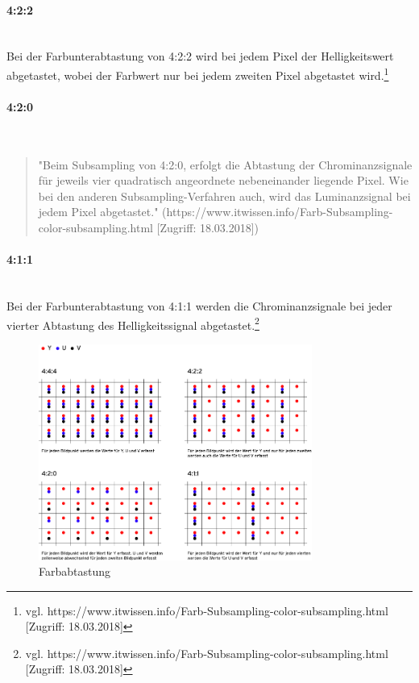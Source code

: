 \paragraph{4:2:2}
\leavevmode \\
Bei der Farbunterabtastung von 4:2:2 wird bei jedem Pixel der Helligkeitswert abgetastet, wobei der Farbwert nur bei jedem zweiten Pixel abgetastet wird.\footnote{\label{}vgl. https://www.itwissen.info/Farb-Subsampling-color-subsampling.html [Zugriff: 18.03.2018]}
\paragraph{4:2:0}
\leavevmode \\
\begin{quote}"Beim Subsampling von 4:2:0, erfolgt die Abtastung der Chrominanzsignale für jeweils vier quadratisch angeordnete nebeneinander liegende Pixel. Wie bei den anderen Subsampling-Verfahren auch, wird das Luminanzsignal bei jedem Pixel abgetastet." (https://www.itwissen.info/Farb-Subsampling-color-subsampling.html [Zugriff: 18.03.2018])\end{quote}
\paragraph{4:1:1}
\leavevmode \\
Bei der Farbunterabtastung von 4:1:1 werden die Chrominanzsignale bei jeder vierter Abtastung des Helligkeitssignal abgetastet.\footnote{\label{}vgl. https://www.itwissen.info/Farb-Subsampling-color-subsampling.html [Zugriff: 18.03.2018]}
\begin{figure}[H]
	\centering	
	\includegraphics[width=0.8\textwidth]{abb15} 
	\caption[Farbabtastung]{Farbabtastung\footnotemark}
\end{figure}

